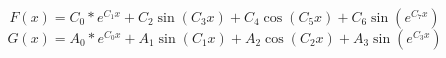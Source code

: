 $$
F(x)=C_0*e^{C_1 x}+C_2 \sin(C_3 x)+C_4 \cos(C_5 x)+C_6 \sin(e^{C_7 x})
$$
$$
G(x)=A_0*e^{C_0 x}+A_1 \sin(C_1 x)+A_2 \cos(C_2 x)+A_3 \sin(e^{C_3 x})
$$
